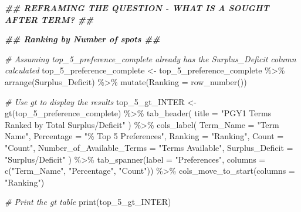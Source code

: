 \documentclass[
]{article}
\newenvironment{Shaded}{\begin{snugshade}}{\end{snugshade}}
\newcommand{\AttributeTok}[1]{\textcolor[rgb]{0.77,0.63,0.00}{#1}}
\newcommand{\CommentTok}[1]{\textcolor[rgb]{0.56,0.35,0.01}{\textit{#1}}}
\newcommand{\DocumentationTok}[1]{\textcolor[rgb]{0.56,0.35,0.01}{\textbf{\textit{#1}}}}
\newcommand{\FunctionTok}[1]{\textcolor[rgb]{0.00,0.00,0.00}{#1}}
\newcommand{\NormalTok}[1]{#1}
\newcommand{\OtherTok}[1]{\textcolor[rgb]{0.56,0.35,0.01}{#1}}
\newcommand{\SpecialCharTok}[1]{\textcolor[rgb]{0.00,0.00,0.00}{#1}}
\newcommand{\StringTok}[1]{\textcolor[rgb]{0.31,0.60,0.02}{#1}}
\begin{document}
\begin{Shaded}
\begin{Highlighting}[]
\DocumentationTok{\#\# REFRAMING THE QUESTION {-} WHAT IS A SOUGHT AFTER TERM? \#\#}

\DocumentationTok{\#\# Ranking by Number of spots \#\#}

\CommentTok{\# Assuming top\_5\_preference\_complete already has the Surplus\_Deficit column calculated}
\NormalTok{top\_5\_preference\_complete }\OtherTok{\textless{}{-}}\NormalTok{ top\_5\_preference\_complete }\SpecialCharTok{\%\textgreater{}\%}
  \FunctionTok{arrange}\NormalTok{(Surplus\_Deficit) }\SpecialCharTok{\%\textgreater{}\%}
  \FunctionTok{mutate}\NormalTok{(}\AttributeTok{Ranking =} \FunctionTok{row\_number}\NormalTok{())}

\CommentTok{\# Use gt to display the results}
\NormalTok{top\_5\_gt\_INTER }\OtherTok{\textless{}{-}} \FunctionTok{gt}\NormalTok{(top\_5\_preference\_complete) }\SpecialCharTok{\%\textgreater{}\%}
  \FunctionTok{tab\_header}\NormalTok{(}
    \AttributeTok{title =} \StringTok{"PGY1 Terms Ranked by Total Surplus/Deficit"}
\NormalTok{  ) }\SpecialCharTok{\%\textgreater{}\%}
  \FunctionTok{cols\_label}\NormalTok{(}
    \AttributeTok{Term\_Name =} \StringTok{"Term Name"}\NormalTok{,}
    \AttributeTok{Percentage =} \StringTok{"\% Top 5 Preferences"}\NormalTok{,}
    \AttributeTok{Ranking =} \StringTok{"Ranking"}\NormalTok{,}
    \AttributeTok{Count =} \StringTok{"Count"}\NormalTok{,}
    \AttributeTok{Number\_of\_Available\_Terms =} \StringTok{"Terms Available"}\NormalTok{,}
    \AttributeTok{Surplus\_Deficit =} \StringTok{"Surplus/Deficit"}
\NormalTok{  ) }\SpecialCharTok{\%\textgreater{}\%}
  \FunctionTok{tab\_spanner}\NormalTok{(}\AttributeTok{label =} \StringTok{"Preferences"}\NormalTok{, }\AttributeTok{columns =} \FunctionTok{c}\NormalTok{(}\StringTok{"Term\_Name"}\NormalTok{, }\StringTok{"Percentage"}\NormalTok{, }\StringTok{"Count"}\NormalTok{)) }\SpecialCharTok{\%\textgreater{}\%}
  \FunctionTok{cols\_move\_to\_start}\NormalTok{(}\AttributeTok{columns =} \StringTok{"Ranking"}\NormalTok{)}

\CommentTok{\# Print the gt table}
\FunctionTok{print}\NormalTok{(top\_5\_gt\_INTER)}
\end{Highlighting}
\end{Shaded}
\end{document}

